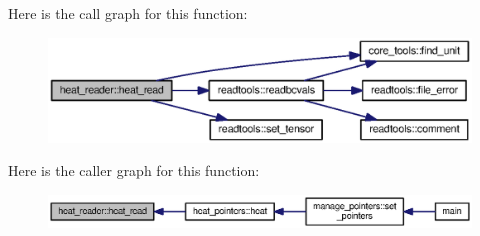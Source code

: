 Here is the call graph for this function\+:\nopagebreak
\begin{figure}[H]
\begin{center}
\leavevmode
\includegraphics[width=350pt]{namespaceheat__reader_a9546371591bb68c6f89b2c9ef80cd42b_cgraph}
\end{center}
\end{figure}




Here is the caller graph for this function\+:\nopagebreak
\begin{figure}[H]
\begin{center}
\leavevmode
\includegraphics[width=350pt]{namespaceheat__reader_a9546371591bb68c6f89b2c9ef80cd42b_icgraph}
\end{center}
\end{figure}


